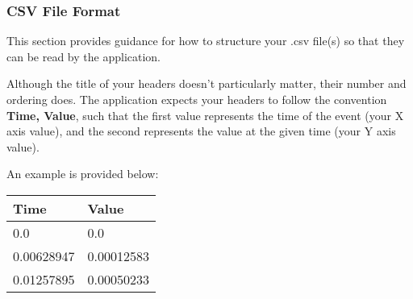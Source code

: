 \subsubsection{CSV File Format} \label{csvFileFormat}
This section provides guidance for how to structure your .csv file(s) so that they can be read by the application. 

Although the title of your headers doesn't particularly matter, their number and ordering does. The application expects your headers to follow the convention {\bf Time, Value}, such that the first value represents the time of the event (your X axis value), and the second represents the value at the given time (your Y axis value). 

An example is provided below: 
\begin{table}[!ht]
    \centering
    \begin{tabular}{|l|l|}
    \hline
        {\bf Time} & {\bf Value} \\ \hline
        0.0 & 0.0 \\ \hline
        0.00628947 & 0.00012583 \\ \hline
        0.01257895 & 0.00050233 \\ \hline
    \end{tabular}
\end{table}